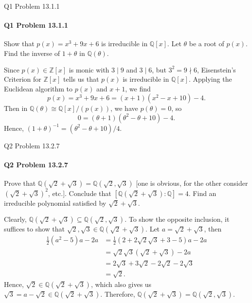 \documentclass[12pt]{article}
\newenvironment{fullbox}{\begin{lrbox}{\savefullbox}\begin{minipage}{\dimexpr\textwidth-2\fboxsep\relax}}{\end{minipage}\end{lrbox}\begin{center}\framebox[\textwidth]{\usebox{\savefullbox}}\end{center}}
\newenvironment{pbox}[1][]{\begin{fullbox}\ifx#1\empty\else\paragraph{#1}\fi}{\end{fullbox}}
\theoremstyle{definition}
\newcommand{\Z}{\mathbb{Z}}
\newcommand{\Q}{\mathbb{Q}}
\newcommand{\isom}{\cong}
\begin{document}
\thispagestyle{title}


\begin{pbox}[Q1 Problem 13.1.1]
    Show that $p(x) = x^3 + 9x + 6$ is irreducible in $\Q[x]$. Let $\theta$ be a root of $p(x)$. Find the inverse of $1 + \theta$ in $\Q(\theta)$.
\end{pbox}

Since $p(x) \in \Z[x]$ is monic with $3 \mid 9$ and $3 \mid 6$, but $3^2 = 9 \nmid 6$, Eisenstein's Criterion for $\Z[x]$ tells us that $p(x)$ is irreducible in $\Q[x]$. Applying the Euclidean algorithm to $p(x)$ and $x + 1$, we find
\[
    p(x) = x^3 + 9x + 6 = (x + 1)(x^2 - x + 10) - 4.
\]
Then in $\Q(\theta) \isom \Q[x]/(p(x))$, we have $p(\theta) = 0$, so
\[
    0 = (\theta + 1)(\theta^2 - \theta + 10) - 4.
\]
Hence, $(1 + \theta)^{-1} = (\theta^2 - \theta + 10)/4$.



\begin{pbox}[Q2 Problem 13.2.7]
    Prove that $\Q(\sqrt{2} + \sqrt{3}) = \Q(\sqrt{2}, \sqrt{3})$ [one is obvious, for the other consider $(\sqrt{2} + \sqrt{3})^2$, etc.]. Conclude that $[\Q(\sqrt{2} + \sqrt{3}) : \Q] = 4$. Find an irreducible polynomial satisfied by $\sqrt{2} + \sqrt{3}$.
\end{pbox}

Clearly, $\Q(\sqrt{2} + \sqrt{3}) \subseteq \Q(\sqrt{2}, \sqrt{3})$. To show the opposite inclusion, it suffices to show that $\sqrt{2}, \sqrt{3} \in \Q(\sqrt{2} + \sqrt{3})$. Let $a =\sqrt{2} + \sqrt{3}$, then
\begin{align*}
    \frac12(a^2 - 5)a - 2a
        &= \frac12(2 + 2\sqrt{2}\sqrt{3} + 3 - 5)a - 2a \\
        &= \sqrt{2}\sqrt{3}(\sqrt{2} + \sqrt{3}) - 2a \\
        &= 2\sqrt{3} + 3\sqrt{2} - 2\sqrt{2} - 2\sqrt{3} \\
        &= \sqrt{2}.
\end{align*}
Hence, $\sqrt{2} \in \Q(\sqrt{2} + \sqrt{3})$, which also gives us $\sqrt{3} = a - \sqrt{2} \in \Q(\sqrt{2} + \sqrt{3})$. Therefore, $\Q(\sqrt{2} + \sqrt{3}) = \Q(\sqrt{2}, \sqrt{3})$.
\end{document}
